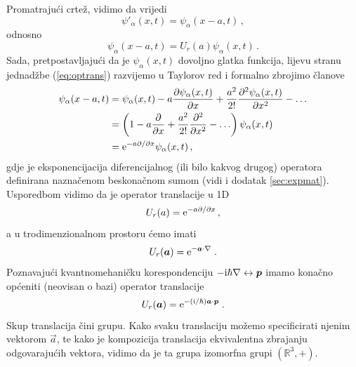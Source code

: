 \centerline{}
Promatrajući crtež, vidimo da vrijedi
\begin{equation}
 \psi'_{\alpha}(x,t)=\psi_{\alpha}(x-a,t) \,,
\end{equation}
odnosno
\begin{equation}
 \psi_{\alpha}(x-a,t)=U_{r}(a)\psi_{\alpha}(x,t)   \,.
 \label{eq:optrans}
\end{equation}
Sada, pretpostavljajući da je $\psi_{\alpha}(x,t)$ dovoljno glatka funkcija,
lijevu stranu jednadžbe (\ref{eq:optrans}) razvijemo u Taylorov red
i formalno zbrojimo članove
\begin{equation*}
\begin{split}
 \psi_{\alpha}(x-a,t)&=\psi_{\alpha}(x,t)-a\frac{\partial\psi_{\alpha}(x,t)}
{\partial x}+\frac{a^2}{2!}\frac{\partial^2 \psi_{\alpha}(x,t)}{\partial x^2}-\ldots \\
&=\left(1-a\frac{\partial}{\partial x}+\frac{a^2}{2!}\frac{\partial^2}{\partial x^2} - \ldots\right)
\psi_{\alpha}(x,t) \\
&=\textrm{e}^{-a \partial / \partial  x} \psi_{\alpha}(x,t) \,,
\end{split}
\end{equation*}
gdje je eksponencijacija diferencijalnog (ili bilo kakvog drugog) operatora
definirana naznačenom beskonačnom sumom (vidi i dodatak \ref{sec:expmat}).
Usporedbom vidimo da je operator translacije u 1D
\begin{equation}
U_r(a)= \textrm{e}^{-a \partial / \partial  x} \,,
\end{equation}
a u trodimenzionalnom prostoru ćemo imati
\begin{equation}
U_r(\vec{a})= \rme^{-\vec{a}\cdot\nabla} \;.
\end{equation}
Poznavajući kvantnomehaničku korespondenciju $-\rmi\hbar\nabla \leftrightarrow
\vec{p}$ imamo konačno općeniti (neovisan o bazi) operator translacije
\begin{equation}
U_r(\vec{a})= \rme^{-(\rmi/\hbar)\vec{a}\cdot\vec{p}} \;.
\label{eq:Ur}
\end{equation}
Skup translacija čini grupu. Kako svaku translaciju možemo specificirati njenim 
vektorom $\vec{a}$, te kako je kompozicija translacija ekvivalentna zbrajanju
odgovarajućih vektora, vidimo da je ta grupa izomorfna grupi $(\mathbb{R}^3, +)$.

